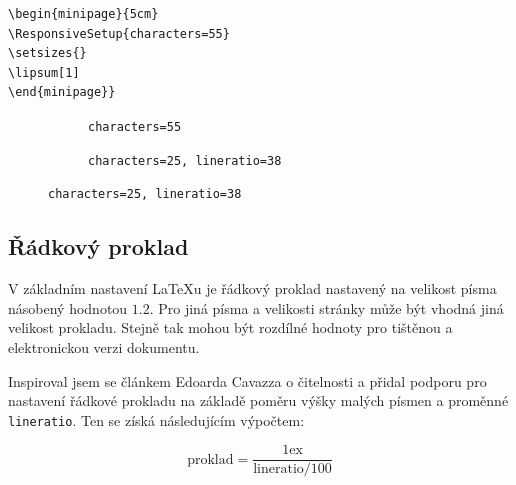 \documentclass{csbulletin}
\begin{document}
\begin{verbatim}
\begin{minipage}{5cm}
\ResponsiveSetup{characters=55}
\setsizes{}
\lipsum[1]
\end{minipage}}
\end{verbatim}

\begin{figure}[tbp]
  \caption{Rozdíl velikosti písma v závislosti na počtu znaků}
  \label{fig:fontsize}
  \begin{subfigure}[t]{0.45\textwidth}
\caption{\texttt{characters=55}}
\end{subfigure}
\hfill
\begin{subfigure}[t]{0.45\textwidth}
\caption{\texttt{characters=25, lineratio=38}}
\end{subfigure}
\end{figure}

\subsection{Řádkový proklad}

V základním nastavení \LaTeX u je řádkový proklad nastavený
na velikost písma násobený hodnotou $1.2$. Pro jiná 
písma a velikosti stránky může být vhodná jiná velikost prokladu.
Stejně tak mohou být rozdílné hodnoty pro tištěnou a elektronickou 
verzi dokumentu. 

Inspiroval jsem se článkem Edoarda Cavazza \cite{cavazza} o čitelnosti
a přidal podporu pro nastavení řádkové prokladu na základě poměru výšky 
malých písmen a proměnné \texttt{lineratio}. Ten se získá následujícím 
výpočtem: 

\[\text{proklad} = \frac{1\text{ex}}{\text{lineratio}/ 100}\]
\end{document}

